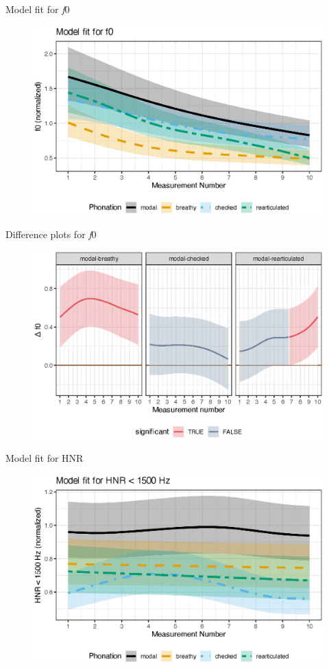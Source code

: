 \documentclass[professionalfonts]{beamer}
\begin{document}
\begin{frame}{Model fit for \textit{f}0}
  \begin{figure}
    \centering
    \includegraphics[width = 0.8\linewidth]{images/LCH_GAMMs/f0_model_fit.eps}
  \end{figure}
\end{frame}

\begin{frame}{Difference plots for \textit{f}0}
  \begin{figure}
    \centering
    \includegraphics[width = 0.8\linewidth]{images/LCH_GAMMs/f0_model_diff.eps}
  \end{figure}
\end{frame}

\begin{frame}{Model fit for HNR}
  \begin{figure}
    \centering
    \includegraphics[width = 0.8\linewidth]{images/LCH_GAMMs/hnr15_model_fit.eps}
  \end{figure}
\end{frame}
\end{document}
